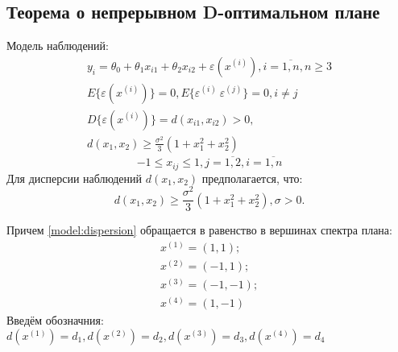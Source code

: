 \subsection{Теорема о непрерывном D-оптимальном плане}
	Модель наблюдений:
	\begin{gather} \label{model:start}
		y_i = \theta_0 + \theta_1 x_{i1} + \theta_2 x_{i2} + \varepsilon(x^{(i)}), i = \overline{1, n}, n \ge 3 \\
		E\{ \varepsilon(x^{(i)}) \} = 0, E\{ \varepsilon^{(i)}\ \varepsilon^{(j)} \} = 0, i \ne j \\
		D\{ \varepsilon(x^{(i)}) \} = d(x_{i1}, x_{i2}) > 0, \\
		d(x_1, x_2) \ge \frac{\sigma^2}{3}(1 + x_1^2 + x_2^2) \label{model:end}
	\end{gather}
		$$ -1 \le x_{ij} \le 1, j = \overline{1, 2}, i = \overline{1, n}$$
	Для дисперсии наблюдений $d(x_1, x_2)$ предполагается, что:
	\begin{equation}\label{model:dispersion}
		d(x_1, x_2) \ge \frac{\sigma^2}{3}(1 + x_1^2 + x_2^2), \sigma > 0.
	\end{equation}

	Причем \eqref{model:dispersion} обращается в равенство в вершинах спектра плана:
	\begin{equation}\label{plan-points}
		\begin{gathered}
		x^{(1)}=(1, 1); \\
		x^{(2)}=(-1, 1); \\
		x^{(3)}=(-1, -1); \\
		x^{(4)}=(1, -1)
		\end{gathered}
	\end{equation}
	Введём обозначния: $d(x^{(1)}) = d_1, d(x^{(2)}) = d_2, d(x^{(3)}) = d_3, d(x^{(4)}) = d_4$
		
